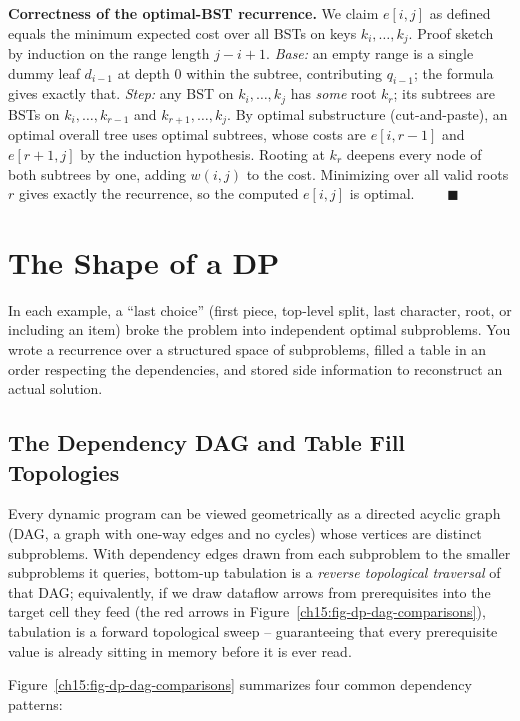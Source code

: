 \begin{formalbox}
\textbf{Correctness of the optimal-BST recurrence.} We claim $e[i,j]$ as defined
equals the minimum expected cost over all BSTs on keys $k_i,\dots,k_j$. Proof
sketch by induction on the range length $j-i+1$. \emph{Base:} an empty range is
a single dummy leaf $d_{i-1}$ at depth $0$ within the subtree, contributing
$q_{i-1}$; the formula gives exactly that. \emph{Step:} any BST on $k_i,\dots,
k_j$ has \emph{some} root $k_r$; its subtrees are BSTs on $k_i,\dots,k_{r-1}$
and $k_{r+1},\dots,k_j$. By optimal substructure (cut-and-paste), an optimal
overall tree uses optimal subtrees, whose costs are $e[i,r-1]$ and $e[r+1,j]$ by
the induction hypothesis. Rooting at $k_r$ deepens every node of both subtrees
by one, adding $w(i,j)$ to the cost. Minimizing over all valid roots $r$ gives
exactly the recurrence, so the computed $e[i,j]$ is optimal. $\qquad\blacksquare$
\end{formalbox}

\section{The Shape of a DP}

In each example, a ``last choice'' (first piece, top-level split, last character, root, or including an item) broke
the problem into independent optimal subproblems. You wrote a recurrence over a
structured space of subproblems, filled a table in an order
respecting the dependencies, and stored side information to reconstruct an
actual solution.

\subsection{The Dependency DAG and Table Fill Topologies}

Every dynamic program can be viewed geometrically as a directed acyclic graph (DAG, a graph with one-way edges and no cycles) whose vertices are distinct subproblems. With dependency edges drawn from each subproblem to the smaller subproblems it queries, bottom-up tabulation is a \emph{reverse topological traversal} of that DAG; equivalently, if we draw dataflow arrows from prerequisites into the target cell they feed (the red arrows in Figure~\ref{ch15:fig-dp-dag-comparisons}), tabulation is a forward topological sweep -- guaranteeing that every prerequisite value is already sitting in memory before it is ever read.

Figure~\ref{ch15:fig-dp-dag-comparisons} summarizes four common dependency patterns:

